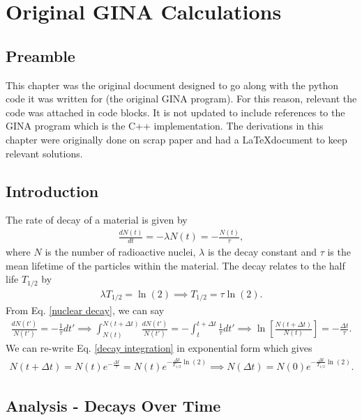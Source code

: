 \chapter{Original GINA Calculations}

\section{Preamble}

This chapter was the original document designed to go along with the python code it was written for (the original GINA program). For this reason, relevant the code was attached in code blocks. It is not updated to include references to the GINA program which is the C++ implementation. The derivations in this chapter were originally done on scrap paper and had a \LaTeX document to keep relevant solutions.

\section{Introduction}

The rate of decay of a material is given by
\begin{align}
\frac{dN(t)}{dt} = -\lambda N(t) = -\frac{N(t)}{\tau}, \label{nuclear decay}
\end{align}
where $N$ is the number of radioactive nuclei, $\lambda$ is the decay constant and $\tau$ is the mean lifetime of the particles within the material. The decay relates to the half life $T_{1/2}$ by
\begin{align}
\lambda T_{1/2} = \ln(2) \implies T_{1/2} = \tau \ln(2).
\end{align} 
From Eq. \ref{nuclear decay}, we can say
\begin{align}
\frac{dN(t')}{N(t')} = -\frac{1}{\tau} dt' \implies \int_{N(t)}^{N(t+\Delta t)} \frac{dN(t')}{N(t')} = -\int_{t}^{t+\Delta t}\frac{1}{\tau} dt' \implies \ln\left[\frac{N(t+\Delta t)}{N(t)}\right] = -\frac{\Delta t}{\tau}. \label{decay integration}
\end{align}
We can re-write Eq. \ref{decay integration} in exponential form which gives
\begin{align}
N(t+\Delta t)= N(t)e^{-\frac{\Delta t}{\tau}}=N(t)e^{-\frac{\Delta t}{T_{1/2}}\ln(2)} \implies N(\Delta t)=N(0)e^{-\frac{\Delta t}{T_{1/2}}\ln(2)}. \label{exponential decay law}
\end{align}


\section{Analysis - Decays Over Time}

